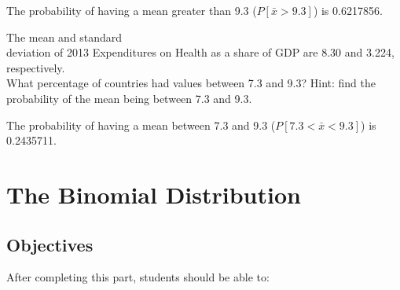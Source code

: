 \documentclass[11pt, chapterprefix=true]{scrbook}\usepackage[]{graphicx}\usepackage[]{color}
\begin{document}
\begin{exercises}
\begin{solution}
    The probability of having a mean greater than 9.3 ($P[ \bar{x} > 9.3 ]$) is 0.6217856.

	\end{solution}

  			\begin{exercise}  %


	  The mean and standard \\ deviation of 2013 Expenditures on Health as a share of GDP are 8.30 and 3.224, respectively.  \\ What percentage of countries had values between 7.3 and 9.3?   Hint: find the probability of the mean being between 7.3 and  9.3.

	  \end{exercise}
	  \vspace{1.5cm}
	  \begin{solution}



    The probability of having a mean between 7.3 and  9.3 ($P[ 7.3 < \bar{x} < 9.3 ]$) is 0.2435711.

	\end{solution}

\end{exercises}

 \onecolumn




\chapter{The Binomial Distribution}
\label{chap:ch7}

\section{Objectives}

After completing this part, students should be able to:

\end{document}
